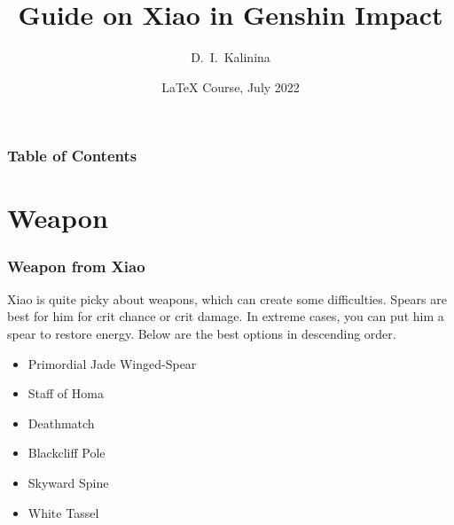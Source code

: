 \documentclass{beamer}
\title[Xiao Guide] %
{Guide on Xiao in Genshin Impact}
\author[Kalinina]
{D.~I.~Kalinina}
\date[LTXC 2022] 
{LaTeX Course, July 2022}
\begin{document}
\frame{\titlepage}


\begin{frame}
\frametitle{Table of Contents}
\tableofcontents
\end{frame}


\section{Weapon}

\begin{frame}
\frametitle{Weapon from Xiao}
Xiao is quite picky about weapons, which can create some difficulties. Spears are best for him for crit chance or crit damage. In extreme cases, you can put him a spear to restore energy. Below are the best options in descending order. 
\begin{itemize}
    \item Primordial Jade Winged-Spear
    \item Staff of Homa
    \item Deathmatch
    \item Blackcliff Pole
    \item Skyward Spine
    \item White Tassel
\end{itemize}
\end{frame}
\end{document}
